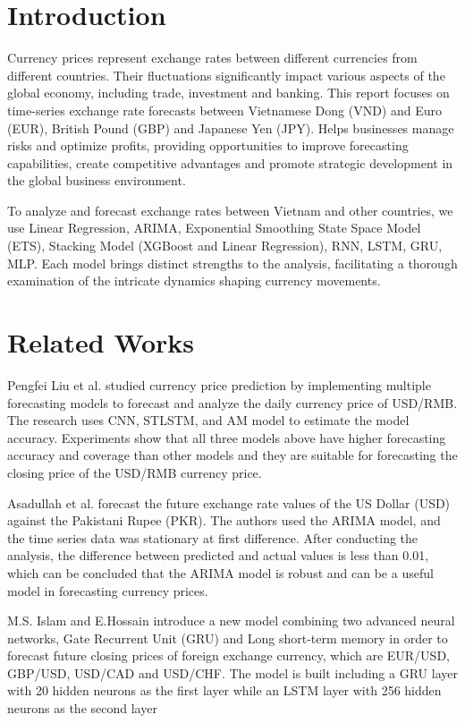 \documentclass{ieeeojies}
\begin{document}
\section{Introduction}
\label{sec:introduction}
\justify
Currency prices represent exchange rates between different currencies from different countries. Their fluctuations significantly impact various aspects of the global economy, including trade, investment and banking. This report focuses on time-series exchange rate forecasts between Vietnamese Dong (VND) and Euro (EUR), British Pound (GBP) and Japanese Yen (JPY). Helps businesses manage risks and optimize profits, providing opportunities to improve forecasting capabilities, create competitive advantages and promote strategic development in the global business environment.

To analyze and forecast exchange rates between Vietnam and other countries, we use Linear Regression, ARIMA, Exponential Smoothing State Space Model (ETS), Stacking Model (XGBoost and Linear Regression), RNN, LSTM, GRU, MLP. Each model brings distinct strengths to the analysis, facilitating a thorough examination of the intricate dynamics shaping currency movements.
\section{Related Works}
\justify
Pengfei Liu et al. \cite{rw1} studied currency price prediction by implementing multiple forecasting models to forecast and analyze the daily currency price of USD/RMB. The research uses CNN, STLSTM, and AM model to estimate the model accuracy. Experiments show that all three models above have higher forecasting accuracy and coverage than other models and they are suitable for forecasting the closing price of the USD/RMB currency price.

Asadullah et al. \cite{rw2} forecast the future exchange rate values of the US Dollar (USD) against the Pakistani Rupee (PKR). The authors used the ARIMA model, and the time series data was stationary at first difference. After conducting the analysis, the difference between predicted and actual values is less than 0.01, which can be concluded that the ARIMA model is robust and can be a useful model in forecasting currency prices.

M.S. Islam and E.Hossain \cite{rw3} introduce a new model combining two advanced neural networks, Gate Recurrent Unit (GRU) and Long short-term memory in order to forecast future closing prices of foreign exchange currency, which are EUR/USD, GBP/USD, USD/CAD and USD/CHF. The model is built including a GRU layer with 20 hidden neurons as the first layer while an LSTM layer with 256 hidden neurons as the second layer
\end{document}
